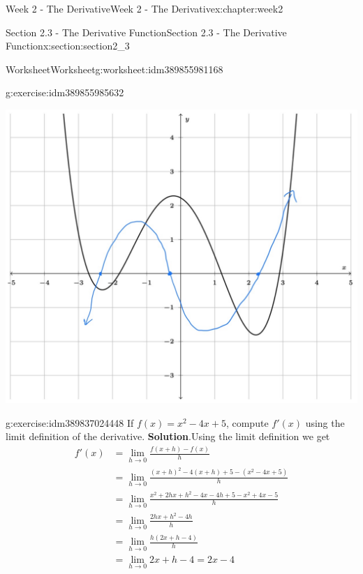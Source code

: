 \documentclass[oneside,10pt,]{book}
\newcommand{\blocktitlefont}{\relax}
\numberwithin{equation}{section}
\newlength{\qrsize}
\newlength{\previewwidth}
\newcommand{\amp}{&}
\begin{document}
\begin{chapterptx}{Week 2 - The Derivative}{}{Week 2 - The Derivative}{}{}{x:chapter:week2}
\begin{sectionptx}{Section 2.3 - The Derivative Function}{}{Section 2.3 - The Derivative Function}{}{}{x:section:section2_3}
\begin{worksheet-subsection}{Worksheet}{}{Worksheet}{}{}{g:worksheet:idm389855981168}
\begin{divisionexercise}{1}{}{}{g:exercise:idm389855985632}
\begin{image}{0}{1}{0}
\includegraphics[width=\linewidth]{images/Math140WkshtDerivative2G2.JPG}
\end{image}%
\end{divisionexercise}%
\begin{divisionexercise}{2}{}{}{g:exercise:idm389837024448}%
If \(f(x) = x^2 - 4x+5\), compute \(f'(x)\) using the limit definition of the derivative.%
\textbf{\blocktitlefont Solution}.\hypertarget{g:solution:idm389776363712}{}\quad{}Using the limit definition we get%
\begin{align*}
f'(x) \amp = \lim_{h\to 0} \frac{f(x+h)-f(x)}{h} \\
\amp = \lim_{h\to 0} \frac{(x+h)^2-4(x+h)+5-(x^2-4x+5)}{h}\\
\amp = \lim_{h\to 0} \frac{x^2+2hx+h^2-4x-4h+5-x^2+4x-5}{h}\\
\amp = \lim_{h\to 0} \frac{2hx+h^2-4h}{h} \\
\amp = \lim_{h\to 0} \frac{h(2x+h-4)}{h}\\
\amp = \lim_{h\to 0} 2x+h-4 = 2x-4 
\end{align*}
\end{divisionexercise}%
\end{worksheet-subsection}
\restoregeometry
\setlength{\qrsize}{9em}
\setlength{\previewwidth}{\linewidth}
\addtolength{\previewwidth}{-\qrsize}
\begin{tcbraster}[raster columns=2, raster column skip=1pt, raster halign=center, raster force size=false, raster left skip=0pt, raster right skip=0pt]%
\begin{tcolorbox}[previewstyle, width=\previewwidth]%

\end{tcolorbox}
\end{tcbraster}
\end{sectionptx}
\end{chapterptx}
\end{document}
